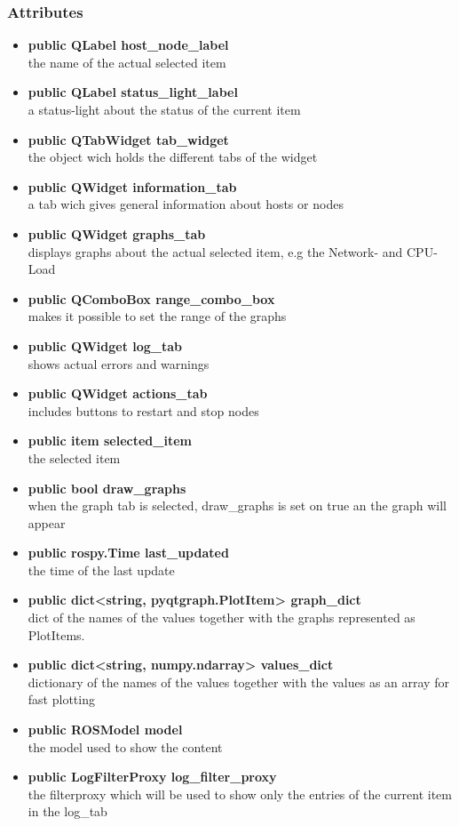 \subsubsection{Attributes}
\begin{itemize}
  \item \textbf{public QLabel host\_node\_label}\\
  the name of the actual selected item
  \item \textbf{public QLabel status\_light\_label}\\
  a status-light about the status of the current item
  \item \textbf{public QTabWidget tab\_widget}\\
  the object wich holds the different tabs of the widget
  \item \textbf{public QWidget information\_tab}\\
  a tab wich gives general information about hosts or nodes 
  \item \textbf{public QWidget graphs\_tab}\\
  displays graphs about the actual selected item, e.g the Network- and
  CPU-Load
  \item \textbf{public QComboBox range\_combo\_box}\\
  makes it possible to set the range of the graphs
  \item \textbf{public QWidget log\_tab}\\
  shows actual errors and warnings
  \item \textbf{public QWidget actions\_tab}\\
  includes buttons to restart and stop nodes
  \item \textbf{public item selected\_item}\\
  the selected item
  \item \textbf{public bool draw\_graphs}\\
  when the graph tab is selected, draw\_graphs is set on true an the graph will
  appear
  \item \textbf{public rospy.Time last\_updated}\\
  the time of the last update
  \item \textbf{public dict<string, pyqtgraph.PlotItem> graph\_dict}\\
  dict of the names of the values together with the graphs represented as PlotItems.
  \item \textbf{public dict<string, numpy.ndarray> values\_dict}\\
  dictionary of the names of the values together with the values as an array for fast plotting
  \item \textbf{public ROSModel model}\\
  the model used to show the content
  \item \textbf{public LogFilterProxy log\_filter\_proxy}\\
  the filterproxy which will be used to show only the entries of the current item in the log\_tab
  
\end{itemize}
